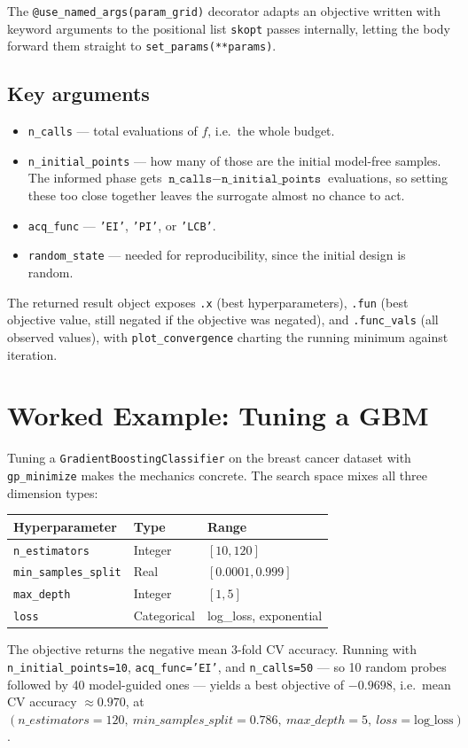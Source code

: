 \documentclass[conference]{IEEEtran}
\begin{document}
The \texttt{@use\_named\_args(param\_grid)} decorator adapts an objective written with keyword arguments to the positional list \texttt{skopt} passes internally, letting the body forward them straight to \texttt{set\_params(**params)}.

\subsection*{Key arguments}
\begin{itemize}
    \item \texttt{n\_calls} --- total evaluations of $f$, i.e.\ the whole budget.
    \item \texttt{n\_initial\_points} --- how many of those are the initial model-free samples. The informed phase gets $\texttt{n\_calls} - \texttt{n\_initial\_points}$ evaluations, so setting these too close together leaves the surrogate almost no chance to act.
    \item \texttt{acq\_func} --- \texttt{'EI'}, \texttt{'PI'}, or \texttt{'LCB'}.
    \item \texttt{random\_state} --- needed for reproducibility, since the initial design is random.
\end{itemize}
The returned result object exposes \texttt{.x} (best hyperparameters), \texttt{.fun} (best objective value, still negated if the objective was negated), and \texttt{.func\_vals} (all observed values), with \texttt{plot\_convergence} charting the running minimum against iteration.

\section*{Worked Example: Tuning a GBM}
Tuning a \texttt{GradientBoostingClassifier} on the breast cancer dataset with \texttt{gp\_minimize} makes the mechanics concrete. The search space mixes all three dimension types:
\begin{center}
\footnotesize
\begin{tabular}{@{}lll@{}}
\toprule
Hyperparameter & Type & Range \\
\midrule
\texttt{n\_estimators}       & Integer     & $[10, 120]$ \\
\texttt{min\_samples\_split} & Real        & $[0.0001, 0.999]$ \\
\texttt{max\_depth}          & Integer     & $[1, 5]$ \\
\texttt{loss}                & Categorical & log\_loss, exponential \\
\bottomrule
\end{tabular}
\end{center}
The objective returns the negative mean 3-fold CV accuracy. Running with \texttt{n\_initial\_points=10}, \texttt{acq\_func='EI'}, and \texttt{n\_calls=50} --- so 10 random probes followed by 40 model-guided ones --- yields a best objective of $-0.9698$, i.e.\ mean CV accuracy $\approx 0.970$, at $(n\_estimators=120,\ min\_samples\_split=0.786,\ max\_depth=5,\ loss=\text{log\_loss})$.
\end{document}
